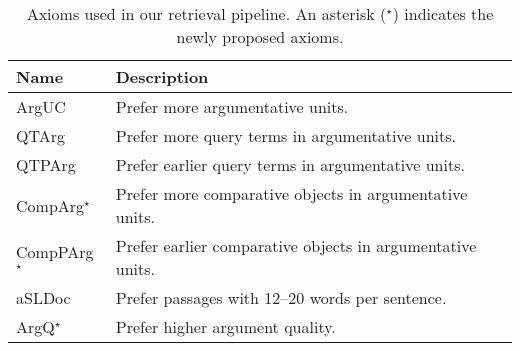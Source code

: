 \begin{table}
    \caption{Axioms used in our retrieval pipeline. An asterisk ($^\star$) indicates the newly proposed axioms.}
    \label{table-axioms}
    \renewcommand{\tabcolsep}{15pt}
    \begin{tabular}{@{}ll@{}}
        \toprule
        \textbf{Name} & \textbf{Description} \\
        \midrule
        ArgUC~\cite{BondarenkoHVSPB2018} & Prefer more argumentative units. \\
        QTArg~\cite{BondarenkoHVSPB2018} & Prefer more query terms in argumentative units. \\
        QTPArg~\cite{BondarenkoHVSPB2018} & Prefer earlier query terms in argumentative units. \\
        CompArg$^\star$ & Prefer more comparative objects in argumentative units. \\
        CompPArg$^\star$& Prefer earlier comparative objects in argumentative units. \\
        aSLDoc~\cite{BondarenkoFKHVS2019} & Prefer passages with 12--20 words per sentence. \\
        ArgQ$^\star$ & Prefer higher argument quality. \\ 
        \bottomrule
    \end{tabular}
\end{table}
